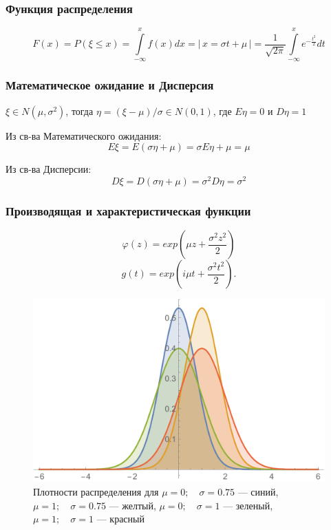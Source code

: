 \documentclass[a4paper]{article}
\begin{document}
\subsubsection{Функция распределения}
$$F(x) = P(\xi\leq x) = \int\limits_{-\infty}^x f(x) dx  =\bigg\vert\, x=\sigma t+\mu\,\bigg\vert = \frac{1}{\sqrt{2\pi}}\int\limits_{-\infty}^{x} e^{-\frac{t^2}{2}} dt  $$


\subsubsection{Математическое ожидание и Дисперсия}

$\xi\in N(\mu,\sigma^2)$, тогда  $\eta=(\xi-\mu)/\sigma\in N(0,1)$, где $E\eta=0$ и $D\eta=1$


Из св-ва Математического ожидания: $$E\xi = E(\sigma\eta+\mu)=\sigma E\eta + \mu = \mu$$

Из св-ва Дисперсии: $$D\xi = D(\sigma\eta+\mu)=\sigma^2 D\eta  = \sigma^2$$



\subsubsection{Производящая и характеристическая функции}
$$\varphi(z) = exp(\mu z+\frac{\sigma^2 z^2}{2}) $$
$$g(t) = exp(i\mu t+\frac{\sigma^2 t^2}{2}).$$
\begin{figure}[h!]
    \centering
    \includegraphics[scale=0.5]{NormalPDF.pdf}
    \caption{Плотности распределения для 	$\mu=0;\quad\sigma=0.75$ --- синий,\quad
	$\mu=1;\quad \sigma=0.75$ --- желтый,\quad
	$\mu=0;\quad \sigma=1$ --- зеленый,\quad
	$\mu=1;\quad \sigma=1$ --- красный
}
\end{figure}
\end{document}
